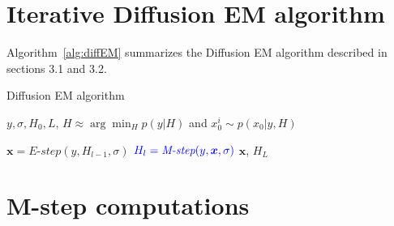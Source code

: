 
\newpage\onecolumn
\appendix
\section{Iterative Diffusion EM algorithm}

Algorithm~\ref{alg:diffEM} summarizes the Diffusion EM algorithm described in sections 3.1 and 3.2.
\begin{algorithm}
    \caption{Diffusion EM algorithm}
    \label{alg:diffEM}
    \begin{algorithmic}
        \Require $y, \sigma, H_0, L$,
        \Ensure $H \approx \arg\min_{H} p(y|H)$ and %
        $x_0^i \sim p(x_0|y,H)$

            \State $\boldsymbol{x} = \textit{E-step}(y, H_{l-1}, \sigma)$ 
            \State $\color{blue}{H_{l} = \textit{M-step}(y, \boldsymbol{x}, \sigma)}$ 
        \EndFor
        \State \Return $\boldsymbol{x}$, $H_L$
    \end{algorithmic}
\end{algorithm}


\section{M-step computations}\label{sec:Mstep}

\newcommand{\fourier}[1]{{\mathcal{F}(#1)}}

